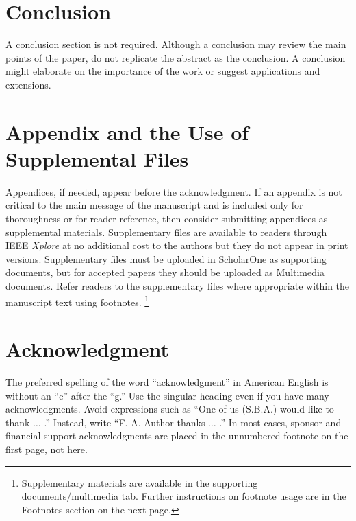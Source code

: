 \documentclass[journal,twoside,web]{ieeecolor}
\begin{document}
\section{Conclusion}
A conclusion section is not required. Although a conclusion may review the 
main points of the paper, do not replicate the abstract as the conclusion.
A conclusion might elaborate on the importance of the work or suggest 
applications and extensions.

\appendices

\section*{Appendix and the Use of Supplemental Files}
Appendices, if needed, appear before the acknowledgment. If an appendix is not
critical to the main message of the manuscript and is included only for thoroughness
or for reader reference, then consider submitting appendices as supplemental materials.
Supplementary files are available to readers through IEEE \emph{Xplore\textregistered}
at no additional cost to the authors but they do not appear in print versions.
Supplementary files must be uploaded in ScholarOne as supporting documents, but for
accepted papers they should be uploaded as Multimedia documents. Refer readers
to the supplementary files where appropriate within the manuscript text using footnotes.
\footnote{Supplementary materials are available in the supporting documents/multimedia tab.
Further instructions on footnote usage are in the Footnotes section on the next page.}

\section*{Acknowledgment}
The preferred spelling of the word ``acknowledgment'' in American English is 
without an ``e'' after the ``g.'' Use the singular heading even if you have 
many acknowledgments. Avoid expressions such as ``One of us (S.B.A.) would 
like to thank $\ldots$ .'' Instead, write ``F. A. Author thanks $\ldots$ .'' In most 
cases, sponsor and financial support acknowledgments are placed in the 
unnumbered footnote on the first page, not here.




\end{document}

